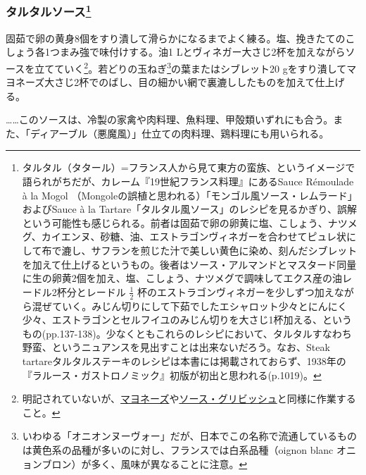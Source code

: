 \begin{recette}
{\subsubsection[タルタルソース]{\texorpdfstring{タルタルソース\footnote{タルタル（タタール）=フランス人から見て東方の蛮族、というイメージで語られがちだが、カレーム『19世紀フランス料理』にあるSauce
  Rémoulade à la Mogol
  （Mongoleの誤植と思われる）「モンゴル風ソース・レムラード」およびSauce
  à la
  Tartare「タルタル風ソース」のレシピを見るかぎり、誤解という可能性も感じられる。前者は固茹で卵の卵黄に塩、こしょう、ナツメグ、カイエンヌ、砂糖、油、エストラゴンヴィネガーを合わせてピュレ状にして布で漉し、サフランを煎じた汁で美しい黄色に染め、刻んだシブレットを加えて仕上げるというもの。後者はソース・アルマンドとマスタード同量に生の卵黄2個を加え、塩、こしょう、ナツメグで調味してエクス産の油レードル2杯分とレードル
  \(\frac{1}{2}\)
  杯のエストラゴンヴィネガーを少しずつ加えながら混ぜていく。みじん切りにして下茹でしたエシャロット少々とにんにく少々、エストラゴンとセルフイユのみじん切りを大さじ1杯加える、というもの(pp.137-138)。少なくともこれらのレシピにおいて、タルタルすなわち野蛮、というニュアンスを見出すことは出来ないだろう。なお、Steak
  tartareタルタルステーキのレシピは本書には掲載されておらず、1938年の『ラルース・ガストロノミック』初版が初出と思われる(p.1019)。}}{タルタルソース}}\label{sauce-tartare}}



固茹で卵の黄身8個をすり潰して滑らかになるまでよく練る。塩、挽きたてのこしょう各1つまみ強で味付けする。油1
Lとヴィネガー大さじ2杯を加えながらソースを立てていく\footnote{明記されていないが、\protect\hyperlink{mayonnaise}{マヨネーズ}や\protect\hyperlink{sauce-gribiche}{ソース・グリビッシュ}と同様に作業すること。}。若どりの玉ねぎ\footnote{いわゆる「オニオンヌーヴォー」だが、日本でこの名称で流通しているものは黄色系の品種が多いのに対し、フランスでは白系品種（oignon
  blanc オニョンブロン）が多く、風味が異なることに注意。}の葉またはシブレット20
gをすり潰してマヨネーズ大さじ2杯でのばし、目の細かい網で裏漉ししたものを加えて仕上げる。

\ldots{}\ldots{}このソースは、冷製の家禽や肉料理、魚料理、甲殻類いずれにも合う。また、「ディアーブル（悪魔風）」仕立ての肉料理、鶏料理にも用いられる。


\end{recette}
